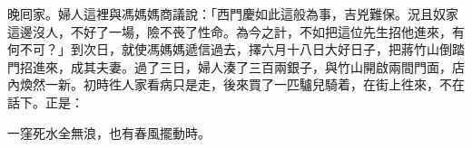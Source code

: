 晚囘家。婦人這裡與馮媽媽商議說：「西門慶如此這般為事，吉兇難保。{}況且奴家這邊沒人，不好了一場，險不䘮了性命。為今之計，不如把這位先生招他進來，有何不可？」到次日，就使馮媽媽遞信過去，擇六月十八日大好日子，把蔣竹山倒踏門招進來，成其夫妻。過了三日，婦人湊了三百兩銀子，與竹山開啟兩間門面，店內煥然一新。初時徃人家看病只是走，後來買了一匹驢兒騎着，在街上徃來，不在話下。正是：

\begin{myquote}
一窪死水全無浪，也有春風擺動時。
\end{myquote}


